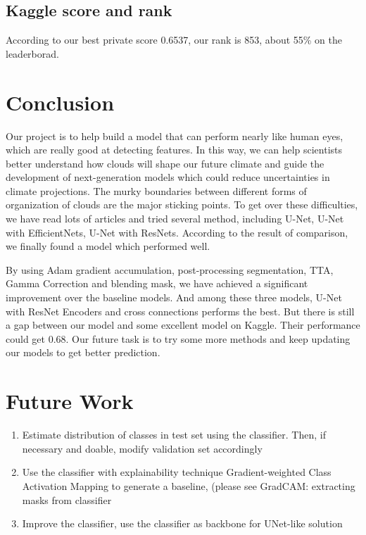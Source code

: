 \documentclass[UTF8]{article}
\begin{document}
\subsection{Kaggle score and rank}
According to our best private score 0.6537, our rank is 853, about 55\% on the leaderborad.
 
\section{Conclusion}
Our project is to help build a model that can perform nearly like human eyes, which are really good at detecting features. In this way, we can help scientists better understand how clouds will shape our future climate and guide the development of next-generation models which could reduce uncertainties in climate projections. The murky boundaries between different forms of organization of clouds are the major sticking points. To get over these difficulties, we have read lots of articles and tried several method, including U-Net, U-Net with EfficientNets, U-Net with ResNets. According to the result of comparison, we finally found a model which performed well.\par
\noindent By using Adam gradient accumulation, post-processing segmentation, TTA, Gamma Correction and blending mask, we have achieved a significant improvement over the baseline models. And among these three models, U-Net with ResNet Encoders and cross connections performs the best. But there is still a gap between our model and some excellent model on Kaggle. Their performance could get 0.68. Our future task is to try some more methods and keep updating our models to get better prediction. \par
\section{Future Work}
\begin{enumerate}
		\item Estimate distribution of classes in test set using the classifier. Then, if necessary and doable, modify validation set accordingly
		\item Use the classifier with explainability technique Gradient-weighted Class Activation Mapping to generate a baseline, (please see GradCAM: extracting masks from classifier 
		\item Improve the classifier, use the classifier as backbone for UNet-like solution
\end{enumerate}
\end{document}
